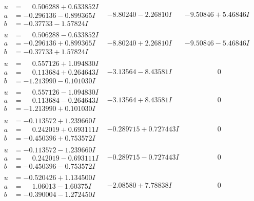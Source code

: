 \documentclass[1p]{elsarticle_modified}
\theoremstyle{definition}
\begin{document}
$$\begin{array}{c|c|c}
\begin{aligned}
u &= \phantom{-}0.506288 + 0.633852 I \\
a &= -0.296136 - 0.899365 I \\
b &= -0.37733 - 1.57824 I\end{aligned}
 & -8.80240 - 2.26810 I & -9.50846 + 5.46846 I \\ \hline\begin{aligned}
u &= \phantom{-}0.506288 - 0.633852 I \\
a &= -0.296136 + 0.899365 I \\
b &= -0.37733 + 1.57824 I\end{aligned}
 & -8.80240 + 2.26810 I & -9.50846 - 5.46846 I \\ \hline\begin{aligned}
u &= \phantom{-}0.557126 + 1.094830 I \\
a &= \phantom{-}0.113684 + 0.264643 I \\
b &= -1.213990 - 0.101030 I\end{aligned}
 & -3.13564 - 8.43581 I & \phantom{-0.000000 } 0 \\ \hline\begin{aligned}
u &= \phantom{-}0.557126 - 1.094830 I \\
a &= \phantom{-}0.113684 - 0.264643 I \\
b &= -1.213990 + 0.101030 I\end{aligned}
 & -3.13564 + 8.43581 I & \phantom{-0.000000 } 0 \\ \hline\begin{aligned}
u &= -0.113572 + 1.239660 I \\
a &= \phantom{-}0.242019 + 0.693111 I \\
b &= -0.450396 + 0.753572 I\end{aligned}
 & -0.289715 + 0.727443 I & \phantom{-0.000000 } 0 \\ \hline\begin{aligned}
u &= -0.113572 - 1.239660 I \\
a &= \phantom{-}0.242019 - 0.693111 I \\
b &= -0.450396 - 0.753572 I\end{aligned}
 & -0.289715 - 0.727443 I & \phantom{-0.000000 } 0 \\ \hline\begin{aligned}
u &= -0.520426 + 1.134500 I \\
a &= \phantom{-}1.06013 - 1.60375 I \\
b &= -0.390004 - 1.272450 I\end{aligned}
 & -2.08580 + 7.78838 I & \phantom{-0.000000 } 0 \\ \hline\begin{aligned}

\end{aligned}
\end{array}$$
\end{document}
